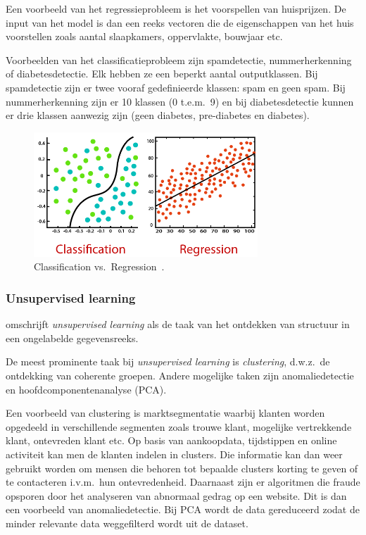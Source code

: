 Een voorbeeld van het regressieprobleem is het voorspellen van huisprijzen. De input van het model is dan een reeks vectoren die de eigenschappen van het huis voorstellen zoals aantal slaapkamers, oppervlakte, bouwjaar etc.

Voorbeelden van het classificatieprobleem zijn spamdetectie, nummerherkenning of diabetesdetectie. Elk hebben ze een beperkt aantal outputklassen. Bij spamdetectie zijn er twee vooraf gedefinieerde klassen: spam en geen spam. Bij nummerherkenning zijn er 10 klassen (0 t.e.m.\ 9) en bij diabetesdetectie kunnen er drie klassen aanwezig zijn (geen diabetes, pre-diabetes en diabetes).

\begin{figure}
    \centering
    \includegraphics[width=0.75\textwidth]{./img/classification_regression}
    \caption{\label{fig:classification_vs_regression} Classification vs.\ Regression~\autocite{JavaTpoint2021}.}
\end{figure}

\subsubsection{Unsupervised learning}
\textcite{Lievens2021} omschrijft \textit{unsupervised learning} als de taak van het ontdekken van structuur in een ongelabelde gegevensreeks.

De meest prominente taak bij \textit{unsupervised learning} is \textit{clustering}, d.w.z.\ de ontdekking van coherente groepen. Andere mogelijke taken zijn anomaliedetectie en hoofdcomponentenanalyse (PCA).

Een voorbeeld van clustering is marktsegmentatie waarbij klanten worden opgedeeld in verschillende segmenten zoals trouwe klant, mogelijke vertrekkende klant, ontevreden klant etc. Op basis van aankoopdata, tijdstippen en online activiteit kan men de klanten indelen in clusters. Die informatie kan dan weer gebruikt worden om mensen die behoren tot bepaalde clusters korting te geven of te contacteren i.v.m.\ hun ontevredenheid.
Daarnaast zijn er algoritmen die fraude opsporen door het analyseren van abnormaal gedrag op een website. Dit is dan een voorbeeld van anomaliedetectie.
Bij PCA wordt de data gereduceerd zodat de minder relevante data weggefilterd wordt uit de dataset.

